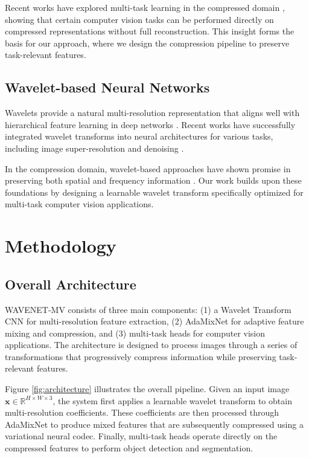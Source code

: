 \documentclass[conference]{IEEEtran}
\begin{document}
Recent works have explored multi-task learning in the compressed domain \cite{choi2022scalable}, showing that certain computer vision tasks can be performed directly on compressed representations without full reconstruction. This insight forms the basis for our approach, where we design the compression pipeline to preserve task-relevant features.

\subsection{Wavelet-based Neural Networks}

Wavelets provide a natural multi-resolution representation that aligns well with hierarchical feature learning in deep networks \cite{liu2018multi}. Recent works have successfully integrated wavelet transforms into neural architectures for various tasks, including image super-resolution \cite{huang2017wavelet} and denoising \cite{liu2018multi}.

In the compression domain, wavelet-based approaches have shown promise in preserving both spatial and frequency information \cite{ma2019learning}. Our work builds upon these foundations by designing a learnable wavelet transform specifically optimized for multi-task computer vision applications.

\section{Methodology}

\subsection{Overall Architecture}

WAVENET-MV consists of three main components: (1) a Wavelet Transform CNN for multi-resolution feature extraction, (2) AdaMixNet for adaptive feature mixing and compression, and (3) multi-task heads for computer vision applications. The architecture is designed to process images through a series of transformations that progressively compress information while preserving task-relevant features.

Figure \ref{fig:architecture} illustrates the overall pipeline. Given an input image $\mathbf{x} \in \mathbb{R}^{H \times W \times 3}$, the system first applies a learnable wavelet transform to obtain multi-resolution coefficients. These coefficients are then processed through AdaMixNet to produce mixed features that are subsequently compressed using a variational neural codec. Finally, multi-task heads operate directly on the compressed features to perform object detection and segmentation.
\end{document}
